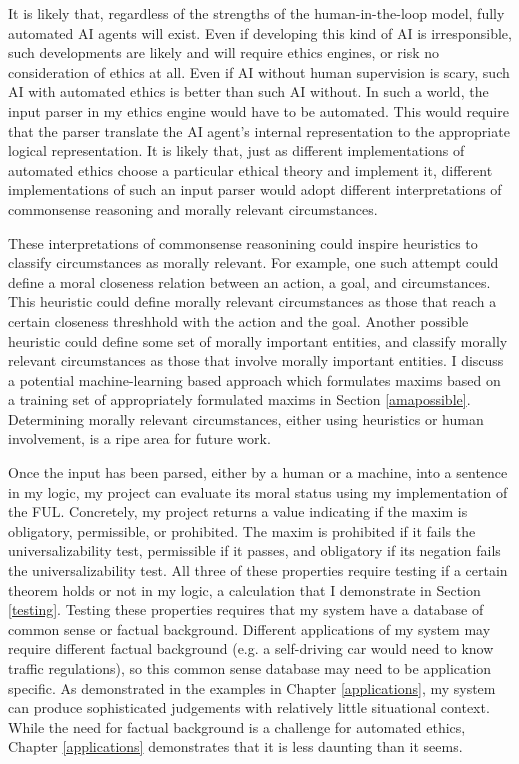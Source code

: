 \begin{isabellebody}
\begin{isamarkuptext}
It is likely that, regardless of the strengths of the human-in-the-loop model, fully automated AI 
agents will exist. Even if developing this kind of AI is irresponsible,
such developments are likely and will require ethics engines, or risk no consideration of ethics at all. Even if 
AI without human supervision is scary, such AI with automated ethics is better than such AI without. 
In such a world, the input parser in my ethics engine would have to be automated. This would require 
that the parser translate the AI agent's internal representation to the appropriate logical representation. 
It is likely that, just as different implementations of automated ethics choose 
a particular ethical theory and implement it, different implementations of such an input parser would 
adopt different interpretations of commonsense reasoning and morally relevant circumstances. 

These interpretations of commonsense reasonining could inspire heuristics to classify circumstances as morally 
relevant. For example, one such attempt could define a moral closeness relation between an action, a 
goal, and circumstances. This heuristic could define morally relevant circumstances as those that 
reach a certain closeness threshhold with the action and the goal. Another possible heuristic could 
define some set of morally important entities, and classify morally relevant circumstances as those
that involve morally important entities. I discuss a potential machine-learning based approach which formulates
maxims based on a training set of appropriately formulated maxims in Section \ref{amapossible}.
Determining morally relevant circumstances, either using heuristics or human involvement, is a ripe 
area for future work.

Once the input has been parsed, either by a human or a machine, into  a sentence in my logic, my 
project can evaluate its moral status using my implementation of 
the FUL. Concretely, my project returns a value indicating if the maxim is obligatory, permissible, 
or prohibited. The maxim is prohibited if it fails the universalizability test, permissible if it passes, and obligatory 
if its negation fails the universalizability test. All three of these properties require testing if a 
certain theorem holds or not in my logic, a calculation that I demonstrate in Section \ref{testing}. 
Testing these properties requires that my system have a database of common sense or factual background. 
Different applications of my system may require different factual background (e.g. a self-driving car 
would need to know traffic regulations), so this common sense database may need to be application 
specific. As demonstrated in the examples in Chapter \ref{applications}, my system can produce sophisticated 
judgements with relatively little situational context. While the need for factual background is a challenge
for automated ethics, Chapter \ref{applications} demonstrates that it is less daunting than it seems. 


\end{isamarkuptext}
\end{isabellebody}
